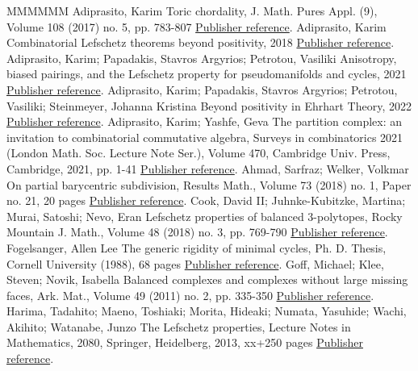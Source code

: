 \documentclass[11pt]{article}
\theoremstyle{definition}
\numberwithin{equation}{section}
\begin{document}
 
\begin{thebibliography}{MMMMMM}
 Adiprasito, Karim Toric chordality, J. Math. Pures Appl. (9), Volume 108 (2017) no. 5, pp. 783-807 \href{https://alco.centre-mersenne.org/articles/10.5802/alco.419/#Adi17}{Publisher reference}.
 Adiprasito, Karim Combinatorial Lefschetz theorems beyond positivity, 2018 \href{https://alco.centre-mersenne.org/articles/10.5802/alco.419/#Adi}{Publisher reference}.
 Adiprasito, Karim; Papadakis, Stavros Argyrios; Petrotou, Vasiliki Anisotropy, biased pairings, and the Lefschetz property for pseudomanifolds and cycles, 2021 \href{https://alco.centre-mersenne.org/articles/10.5802/alco.419/#APP}{Publisher reference}.
 Adiprasito, Karim; Papadakis, Stavros Argyrios; Petrotou, Vasiliki; Steinmeyer, Johanna Kristina Beyond positivity in Ehrhart Theory, 2022 \href{https://alco.centre-mersenne.org/articles/10.5802/alco.419/#APPS}{Publisher reference}.
 Adiprasito, Karim; Yashfe, Geva The partition complex: an invitation to combinatorial commutative algebra, Surveys in combinatorics 2021 (London Math. Soc. Lecture Note Ser.), Volume 470, Cambridge Univ. Press, Cambridge, 2021, pp. 1-41 \href{https://alco.centre-mersenne.org/articles/10.5802/alco.419/#AY}{Publisher reference}.
 Ahmad, Sarfraz; Welker, Volkmar On partial barycentric subdivision, Results Math., Volume 73 (2018) no. 1, Paper no. 21, 20 pages \href{https://alco.centre-mersenne.org/articles/10.5802/alco.419/#AW}{Publisher reference}.
 Cook, David II; Juhnke-Kubitzke, Martina; Murai, Satoshi; Nevo, Eran Lefschetz properties of balanced 3-polytopes, Rocky Mountain J. Math., Volume 48 (2018) no. 3, pp. 769-790 \href{https://alco.centre-mersenne.org/articles/10.5802/alco.419/#CJMN}{Publisher reference}.
 Fogelsanger, Allen Lee The generic rigidity of minimal cycles, Ph. D. Thesis, Cornell University (1988), 68 pages \href{https://alco.centre-mersenne.org/articles/10.5802/alco.419/#Fog}{Publisher reference}.
 Goff, Michael; Klee, Steven; Novik, Isabella Balanced complexes and complexes without large missing faces, Ark. Mat., Volume 49 (2011) no. 2, pp. 335-350 \href{https://alco.centre-mersenne.org/articles/10.5802/alco.419/#GKN}{Publisher reference}.
 Harima, Tadahito; Maeno, Toshiaki; Morita, Hideaki; Numata, Yasuhide; Wachi, Akihito; Watanabe, Junzo The Lefschetz properties, Lecture Notes in Mathematics, 2080, Springer, Heidelberg, 2013, xx+250 pages \href{https://alco.centre-mersenne.org/articles/10.5802/alco.419/#HMMNWW}{Publisher reference}.

\end{thebibliography}
\end{document}
